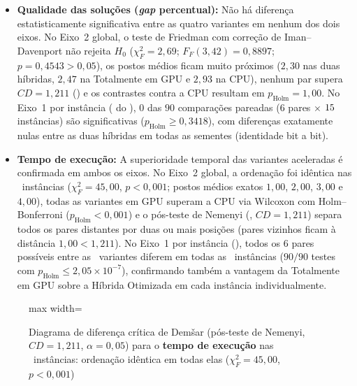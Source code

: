 \begin{itemize}
  \item
        \textbf{Qualidade das soluções (\emph{gap} percentual):} Não há diferença estatisticamente significativa entre as quatro variantes em nenhum dos dois eixos. No Eixo~2 global, o teste de Friedman com correção de Iman--Davenport não rejeita \(H_0\) (\(\chi_F^2 = 2{,}69\); \(F_F(3, 42) = 0{,}8897\); \(p = 0{,}4543 > 0{,}05\)), os postos médios ficam muito próximos (\(2{,}30\) nas duas híbridas, \(2{,}47\) na Totalmente em GPU e \(2{,}93\) na CPU), nenhum par supera \(CD = 1{,}211\) () e os contrastes contra a CPU resultam em \(p_{\text{Holm}} = 1{,}00\). No Eixo~1 por instância ( do ), \(0\) das \(90\) comparações pareadas (\(6\) pares \(\times\) \(15\) instâncias) são significativas (\(p_{\text{Holm}} \ge 0{,}3418\)), com diferenças exatamente nulas entre as duas híbridas em todas as sementes (identidade bit a bit).
  \item
        \textbf{Tempo de execução:} A superioridade temporal das variantes aceleradas é confirmada em ambos os eixos. No Eixo~2 global, a ordenação foi idêntica nas \totalinstancias\ instâncias (\(\chi_F^2 = 45{,}00\), \(p < 0{,}001\); postos médios exatos \(1{,}00\), \(2{,}00\), \(3{,}00\) e \(4{,}00\)), todas as variantes em GPU superam a CPU via Wilcoxon com Holm--Bonferroni (\(p_{\text{Holm}} < 0{,}001\)) e o pós-teste de Nemenyi (, \(CD = 1{,}211\)) separa todos os pares distantes por duas ou mais posições (pares vizinhos ficam à distância \(1{,}00 < 1{,}211\)). No Eixo~1 por instância (), todos os \(6\) pares possíveis entre as \totalvariantes\ variantes diferem em todas as \totalinstancias\ instâncias (\(90/90\) testes com \(p_{\text{Holm}} \le 2{,}05 \times 10^{-7}\)), confirmando também a vantagem da Totalmente em GPU sobre a Híbrida Otimizada em cada instância individualmente.
\end{itemize}

\begin{figure}[htbp]
  \centering
  \caption{Diagrama de diferença crítica de Demšar (pós-teste de Nemenyi, \(CD = 1{,}211\), \(\alpha = 0{,}05\)) para o \textbf{tempo de execução} nas \totalinstancias\ instâncias: ordenação idêntica em todas elas (\(\chi_F^2 = 45{,}00\), \(p < 0{,}001\))}\label{fig:cd-diagram-time}
  \begin{adjustbox}{max width=\linewidth}
    
  \end{adjustbox}
\end{figure}

